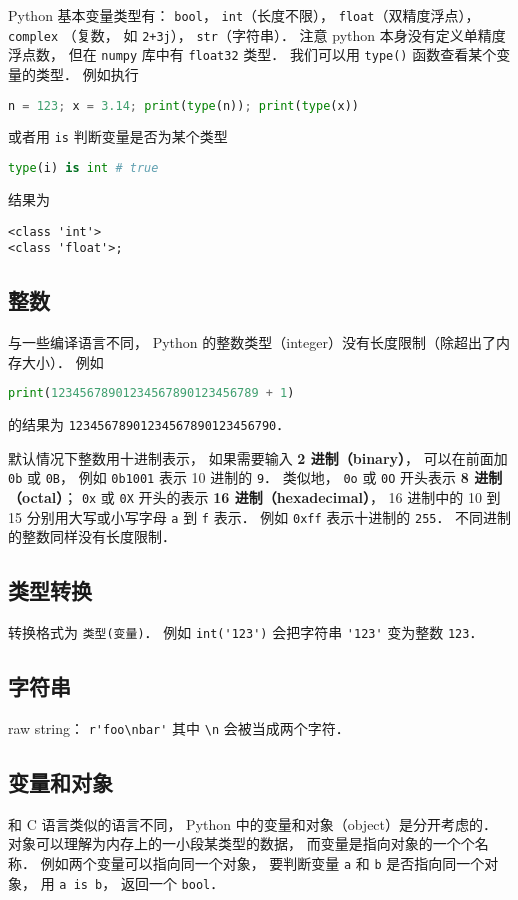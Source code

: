 
\begin{issues}
\issueDraft
\end{issues}


Python 基本变量类型有： \verb|bool|， \verb|int|（长度不限）， \verb|float|（双精度浮点）， \verb|complex| （复数， 如 \verb|2+3j|）， \verb|str|（字符串）． 注意 python 本身没有定义单精度浮点数， 但在 \verb|numpy| 库中有 \verb|float32| 类型． 我们可以用 \verb|type()| 函数查看某个变量的类型． 例如执行
\begin{lstlisting}[language=python]
n = 123; x = 3.14; print(type(n)); print(type(x))
\end{lstlisting}
或者用 \verb|is| 判断变量是否为某个类型
\begin{lstlisting}[language=python]
type(i) is int # true
\end{lstlisting}
结果为
\begin{lstlisting}
<class 'int'>
<class 'float'>;
\end{lstlisting}

\subsection{整数}
与一些编译语言不同， Python 的整数类型（integer）没有长度限制（除超出了内存大小）． 例如
\begin{lstlisting}[language=python]
print(12345678901234567890123456789 + 1)
\end{lstlisting}
的结果为 \verb|12345678901234567890123456790|．

默认情况下整数用十进制表示， 如果需要输入 \textbf{2 进制（binary）}， 可以在前面加 \verb|0b| 或 \verb|0B|， 例如 \verb|0b1001| 表示 10 进制的 \verb|9|． 类似地， \verb|0o| 或 \verb|0O| 开头表示 \textbf{8 进制（octal）}； \verb|0x| 或 \verb|0X| 开头的表示 \textbf{16 进制（hexadecimal）}， 16 进制中的 10 到 15 分别用大写或小写字母 \verb|a| 到 \verb|f| 表示． 例如 \verb|0xff| 表示十进制的 \verb|255|． 不同进制的整数同样没有长度限制．

\subsection{类型转换}
转换格式为 \verb|类型(变量)|． 例如 \verb|int('123')| 会把字符串 \verb|'123'| 变为整数 \verb|123|．

\subsection{字符串}
raw string： \verb|r'foo\nbar'| 其中 \verb|\n| 会被当成两个字符．

\subsection{变量和对象}
和 C 语言类似的语言不同， Python 中的变量和对象（object）是分开考虑的． 对象可以理解为内存上的一小段某类型的数据， 而变量是指向对象的一个个名称． 例如两个变量可以指向同一个对象， 要判断变量 \verb|a| 和 \verb|b| 是否指向同一个对象， 用 \verb|a is b|， 返回一个 \verb|bool|．
